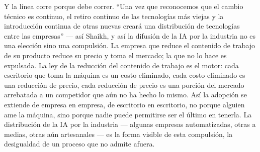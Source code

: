 \documentclass[11pt]{article}
\begin{document}
Y la línea corre porque debe correr. \enquote{Una vez que reconocemos
que el cambio técnico es continuo, el retiro continuo de las tecnologías
más viejas y la introducción continua de otras nuevas creará una
distribución de tecnologías entre las empresas} --- así Shaikh, y así la
difusión de la IA por la industria no es una elección sino una
compulsión. La empresa que reduce el contenido de trabajo de su producto
reduce su precio y toma el mercado; la que no lo hace es expulsada. La
ley de la reducción del contenido de trabajo es el motor: cada
escritorio que toma la máquina es un costo eliminado, cada costo
eliminado es una reducción de precio, cada reducción de precio es una
porción del mercado arrebatada a un competidor que aún no ha hecho lo
mismo. Así la adopción se extiende de empresa en empresa, de escritorio
en escritorio, no porque alguien ame la máquina, sino porque nadie puede
permitirse ser el último en tenerla. La distribución de la IA por la
industria --- algunas empresas automatizadas, otras a medias, otras aún
artesanales --- es la forma visible de esta compulsión, la desigualdad
de un proceso que no admite afuera.
\end{document}
